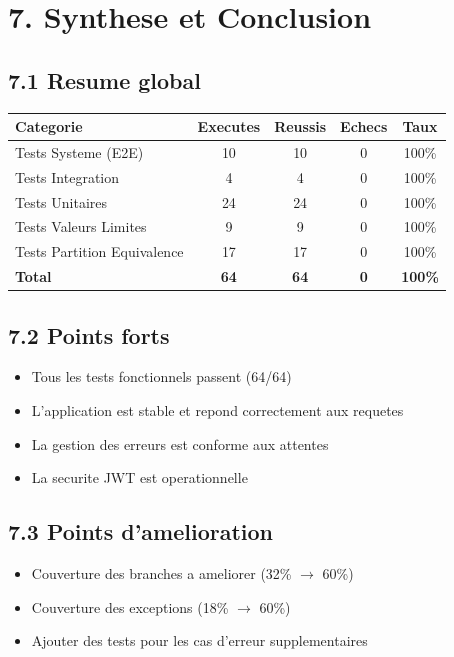 \documentclass[12pt,a4paper]{article}
\begin{document}
\newpage

\section*{7. Synthese et Conclusion}

\subsection*{7.1 Resume global}

\begin{table}[h]
\centering
\begin{tabular}{|l|c|c|c|c|}
\hline
\rowcolor[gray]{0.9}
\textbf{Categorie} & \textbf{Executes} & \textbf{Reussis} & \textbf{Echecs} & \textbf{Taux} \\
\hline
Tests Systeme (E2E) & 10 & 10 & 0 & 100\% \\
\hline
Tests Integration & 4 & 4 & 0 & 100\% \\
\hline
Tests Unitaires & 24 & 24 & 0 & 100\% \\
\hline
Tests Valeurs Limites & 9 & 9 & 0 & 100\% \\
\hline
Tests Partition Equivalence & 17 & 17 & 0 & 100\% \\
\hline
\textbf{Total} & \textbf{64} & \textbf{64} & \textbf{0} & \textbf{100\%} \\
\hline
\end{tabular}
\end{table}

\subsection*{7.2 Points forts}

\begin{itemize}
    \item Tous les tests fonctionnels passent (64/64)
    \item L'application est stable et repond correctement aux requetes
    \item La gestion des erreurs est conforme aux attentes
    \item La securite JWT est operationnelle
\end{itemize}

\subsection*{7.3 Points d'amelioration}

\begin{itemize}
    \item Couverture des branches a ameliorer (32\% $\rightarrow$ 60\%)
    \item Couverture des exceptions (18\% $\rightarrow$ 60\%)
    \item Ajouter des tests pour les cas d'erreur supplementaires
\end{itemize}
\end{document}
